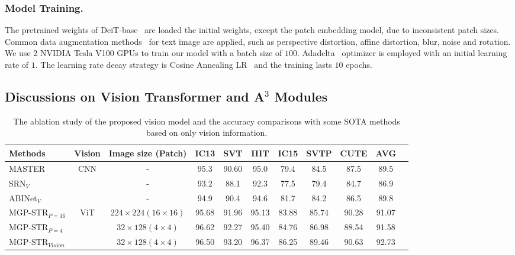 \documentclass[runningheads]{llncs}
\begin{document}
\subsubsection{Model Training.} 
The pretrained weights of DeiT-base~\cite{deit} are loaded the initial weights, except the patch embedding model, due to inconsistent patch sizes.
Common data augmentation methods~\cite{randaug} for text image are applied, such as perspective distortion, affine distortion, blur, noise and rotation.
We use $2$ NVIDIA Tesla V100 GPUs to train our model with a batch size of $100$. Adadelta~\cite{Adadelta} optimizer is employed with an initial learning rate of $1$.
The learning rate decay strategy is Cosine Annealing LR~\cite{cosinlr} and the training lasts $10$ epochs.

\subsection{Discussions on Vision Transformer and A$^3$ Modules} 

\begin{table*}[t]\centering
\setlength{\tabcolsep}{1pt}
\caption{The ablation study of the proposed vision model and the accuracy comparisons with some SOTA methods based on only vision information.}
\label{tab:char}
\begin{tabular}{|l|c|c|c|c|c|c|c|c|c|c|}
\hline
Methods & Vision & Image size (Patch) &IC13&SVT  &IIIT   & IC15 & SVTP &CUTE  &AVG \\
\hline
MASTER~\cite{MASTER} &   \multirow{3}{*}{CNN}  & - &95.3 &90.60 &95.0 &79.4 &84.5 &87.5 &89.5	 \\
SRN$_V$~\cite{SRN}  &  & - &93.2 &88.1 &92.3 &77.5 &79.4 &84.7 &86.9	 \\
ABINet$_V$~\cite{ABInet}   &  & - &94.9 &90.4 &94.6 &81.7 &84.2 &86.5 &89.8 \\
\hline
MGP-STR$_{P=16}$ &  \multirow{3}{*}{ViT}   & $ 224 \times 224 (16 \times 16) $ &95.68	&91.96	&95.13	&83.88	&85.74	&90.28	&91.07	 \\
MGP-STR$_{P=4}$ &  & $ 32 \times 128 (4 \times 4) $ &96.62	&92.27	&95.40	&84.76	&86.98	&88.54	&91.58	 \\
MGP-STR$_{Vision}$  &  & $  32 \times 128 (4 \times 4)$ &96.50 &93.20 &{96.37} &86.25 &89.46 &{90.63} &92.73 \\
\hline
\end{tabular}
\end{table*}
\end{document}
